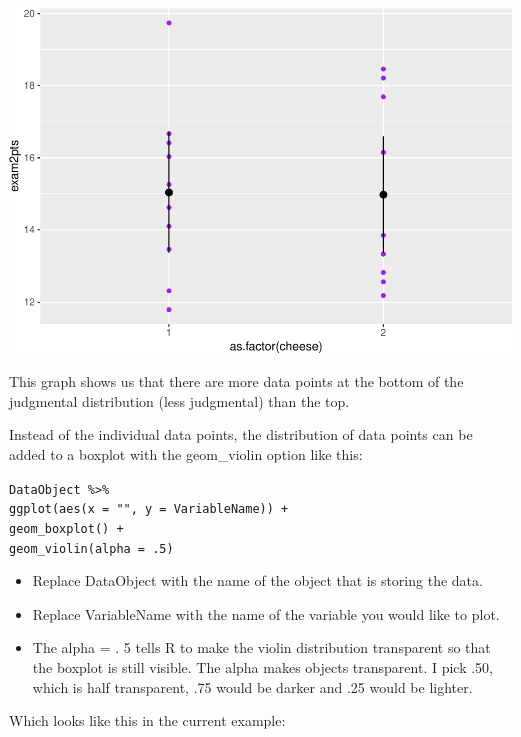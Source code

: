 \documentclass[
]{book}
\newenvironment{Shaded}{\begin{snugshade}}{\end{snugshade}}
\newcommand{\DataTypeTok}[1]{\textcolor[rgb]{0.13,0.29,0.53}{#1}}
\newcommand{\FloatTok}[1]{\textcolor[rgb]{0.00,0.00,0.81}{#1}}
\newcommand{\KeywordTok}[1]{\textcolor[rgb]{0.13,0.29,0.53}{\textbf{#1}}}
\newcommand{\NormalTok}[1]{#1}
\newcommand{\OperatorTok}[1]{\textcolor[rgb]{0.81,0.36,0.00}{\textbf{#1}}}
\newcommand{\StringTok}[1]{\textcolor[rgb]{0.31,0.60,0.02}{#1}}
\providecommand{\tightlist}{%
  \setlength{\itemsep}{0pt}\setlength{\parskip}{0pt}}
\begin{document}
\includegraphics{Tools-for-working-with-data-211_files/figure-latex/unnamed-chunk-4-1.pdf}

This graph shows us that there are more data points at the bottom of the judgmental distribution (less judgmental) than the top.

Instead of the individual data points, the distribution of data points can be added to a boxplot with the geom\_violin option like this:

\texttt{DataObject\ \%\textgreater{}\%}\\
\texttt{ggplot(aes(x\ =\ "",\ y\ =\ VariableName))\ +}~\\
\texttt{geom\_boxplot()\ +}~\\
\texttt{geom\_violin(alpha\ =\ .5)}

\begin{itemize}
\tightlist
\item
  Replace DataObject with the name of the object that is storing the data.\\
\item
  Replace VariableName with the name of the variable you would like to plot.\\
\item
  The alpha = . 5 tells R to make the violin distribution transparent so that the boxplot is still visible. The alpha makes objects transparent. I pick .50, which is half transparent, .75 would be darker and .25 would be lighter.
\end{itemize}

Which looks like this in the current example:

\begin{Shaded}
\end{Shaded}
\end{document}
